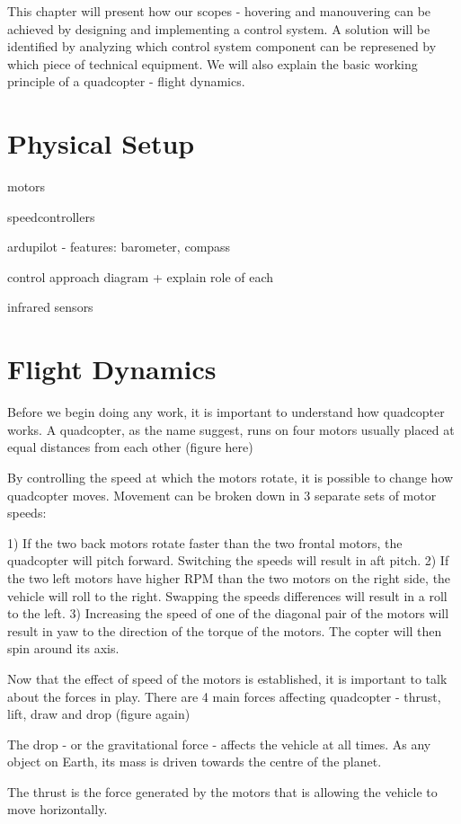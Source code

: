 This chapter will present how our scopes - hovering and manouvering can be achieved by designing and implementing a control system. A solution will be identified by analyzing which control system component can be represened by which piece of technical equipment. We will also explain the basic working principle of a quadcopter - flight dynamics.

\section{Physical Setup}
motors

speedcontrollers

ardupilot - features: barometer, compass 

control approach diagram + explain role of each

infrared sensors

\section{Flight Dynamics}
Before we begin doing any work, it is important to understand how quadcopter works. A quadcopter, as the name suggest, runs on four motors usually placed at equal distances from each other (figure here)

By controlling the speed at which the motors rotate, it is possible to change how quadcopter moves. Movement can be broken down in 3 separate sets of motor speeds:

1) If the two back motors rotate faster than the two frontal motors, the quadcopter will pitch forward. Switching the speeds will result in aft pitch.
2) If the two left motors have higher RPM than the two motors on the right side, the vehicle will roll to the right. Swapping the speeds differences will result in a roll to the left.
3) Increasing the speed of one of the diagonal pair of the motors will result in yaw to the direction of the torque of the motors. The copter will then spin around its axis.

Now that the effect of speed of the motors is established, it is important to talk about the forces in play. There are 4 main forces affecting quadcopter - thrust, lift, draw and drop (figure again)

The drop - or the gravitational force - affects the vehicle at all times. As any object on Earth, its mass is driven towards the centre of the planet.

The thrust is the force generated by the motors that is allowing the vehicle to move horizontally.


